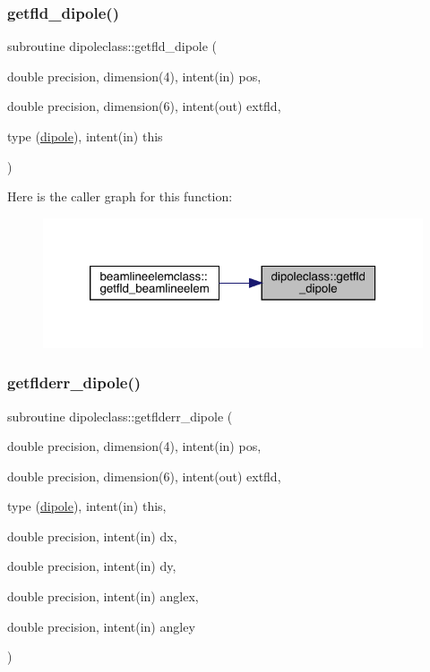 \mbox{\label{namespacedipoleclass_ac8c755e07904e113f223ee5ef029ac93}} 
\subsubsection{\texorpdfstring{getfld\_dipole()}{getfld\_dipole()}}
{\footnotesize\ttfamily subroutine dipoleclass\+::getfld\+\_\+dipole (\begin{DoxyParamCaption}\item[{double precision, dimension(4), intent(in)}]{pos,  }\item[{double precision, dimension(6), intent(out)}]{extfld,  }\item[{type (\mbox{\hyperlink{namespacedipoleclass_structdipoleclass_1_1dipole}{dipole}}), intent(in)}]{this }\end{DoxyParamCaption})}

Here is the caller graph for this function\+:\nopagebreak
\begin{figure}[H]
\begin{center}
\leavevmode
\includegraphics[width=320pt]{namespacedipoleclass_ac8c755e07904e113f223ee5ef029ac93_icgraph}
\end{center}
\end{figure}
\mbox{\label{namespacedipoleclass_a0a75204835a2e4dd1ea67c1ee32e62fe}} 
\subsubsection{\texorpdfstring{getflderr\_dipole()}{getflderr\_dipole()}}
{\footnotesize\ttfamily subroutine dipoleclass\+::getflderr\+\_\+dipole (\begin{DoxyParamCaption}\item[{double precision, dimension(4), intent(in)}]{pos,  }\item[{double precision, dimension(6), intent(out)}]{extfld,  }\item[{type (\mbox{\hyperlink{namespacedipoleclass_structdipoleclass_1_1dipole}{dipole}}), intent(in)}]{this,  }\item[{double precision, intent(in)}]{dx,  }\item[{double precision, intent(in)}]{dy,  }\item[{double precision, intent(in)}]{anglex,  }\item[{double precision, intent(in)}]{angley }\end{DoxyParamCaption})}



